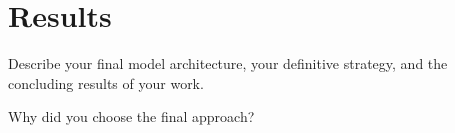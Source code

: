 \section{Results}

Describe your final model architecture, your definitive strategy, and the concluding results of your work.

Why did you choose the final approach?